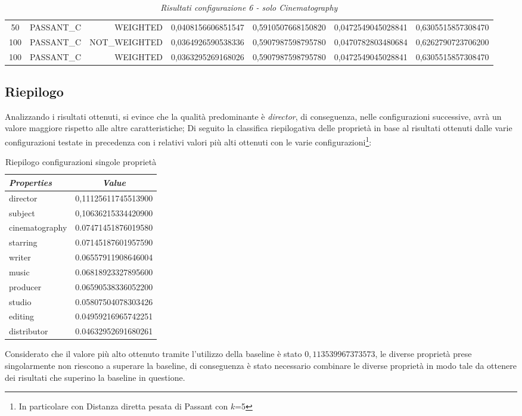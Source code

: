 \begin{table}[H]
{\begin{tabular}{ c l r c c c c }
				50 &  PASSANT\_C &   WEIGHTED & 0,0408156606851547 & 0,5910507668150820 & 0,0472549045028841 & 0,6305515857308470 \\
				
				100 &  PASSANT\_C & NOT\_WEIGHTED & 0,0364926590538336 & 0,5907987598795780 & 0,0470782803480684 & 0,6262790723706200 \\
				
				100 &  PASSANT\_C &   WEIGHTED & 0,0363295269168026 & 0,5907987598795780 & 0,0472549045028841 & 0,6305515857308470 \\
			\bottomrule
		\end{tabular}  
	}
	\caption{\emph{Risultati configurazione 6 - solo Cinematography}}
\end{table}

\subsection{Riepilogo}
Analizzando i risultati ottenuti, si evince che la qualità predominante è \emph{director}, di conseguenza, nelle configurazioni successive, avrà un valore maggiore rispetto alle altre caratteristiche; Di seguito la classifica riepilogativa delle proprietà in base al risultati ottenuti dalle varie configurazioni testate in precedenza con i relativi valori più alti ottenuti con le varie configurazioni\footnote{In particolare con Distanza diretta pesata di Passant con $k$=5}:
\begin{table}[H]
	\small
	\centering
	\begin{tabular}{l c}
		\textit{Properties} & \textit{Value}\\\hline
		director & 0,11125611745513900 \\
		subject & 0,10636215334420900 \\
		cinematography & 0.07471451876019580 \\
		starring & 0.07145187601957590 \\
		writer & 0.06557911908646004 \\
		music & 0.06818923327895600 \\
		producer & 0.06590538336052200 \\
		studio & 0.05807504078303426 \\
		editing	& 0.04959216965742251 \\
		distributor & 0.04632952691680261 \\
	\end{tabular}
	\caption{Riepilogo configurazioni singole proprietà}
\end{table}
Considerato che il valore più alto ottenuto tramite l'utilizzo della baseline è stato $0,113539967373573$, le diverse proprietà prese singolarmente non riescono a superare la baseline, di conseguenza è stato necessario combinare le diverse proprietà in modo tale da ottenere dei risultati che superino la baseline in questione.

